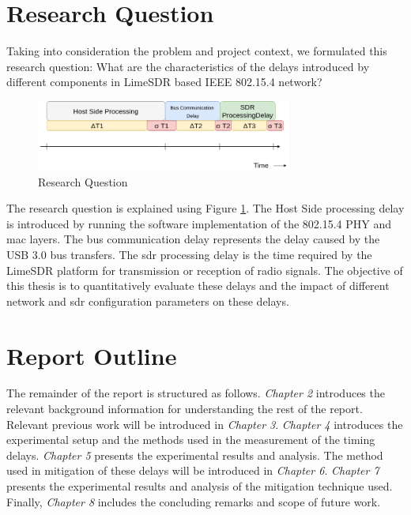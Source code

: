 







\section{Research Question}
Taking into consideration the problem and project context, we formulated this research question:
What are the characteristics of the delays introduced by different components in LimeSDR based IEEE 802.15.4 network?
\begin{figure}[!h]
\centering
\includegraphics[width=0.75\textwidth]{Figure/RQ1.png}
\caption{Research Question}
\label{rq1}
\end{figure}

The research question is explained using Figure \ref{rq1}.
The Host Side processing delay is introduced by running the software implementation of the 802.15.4 \ac{PHY} and \ac{mac} layers.
The bus communication delay represents the delay caused by the \ac{USB} 3.0 bus transfers.
The \ac{sdr} processing delay is the time required by the LimeSDR platform for transmission or reception of radio signals.
The objective of this thesis is to quantitatively evaluate these delays and the impact of different network and \ac{sdr} configuration parameters on these delays.

\section{Report Outline}
The remainder of the report is structured as follows. \textit{Chapter 2} introduces the relevant background information for understanding the rest of the report.
Relevant previous work will be introduced in \textit{Chapter 3}.
\textit{Chapter 4} introduces the experimental setup and the methods used in the measurement of the timing delays. \textit{Chapter 5} presents the experimental results and analysis.
The method used in mitigation of these delays will be introduced in \textit{Chapter 6}.
\textit{Chapter 7} presents the experimental results and analysis of the mitigation technique used.
Finally, \textit{Chapter 8} includes the concluding remarks and scope of future work.
